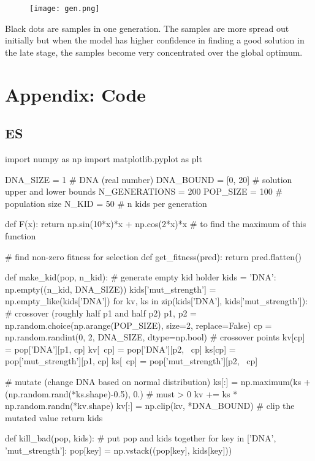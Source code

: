 \documentclass[12pt]{article}
\begin{document}
\begin{figure}[htbp]
	\centering
	\texttt{[image: gen.png]}
\end{figure}
Black dots are samples in one generation. The samples are more spread out initially but when the model has higher confidence in finding a good solution in the late stage, the samples become very concentrated over the global optimum. 

\newpage
\section{Appendix: Code}
\subsection{ES}
\begin{python}
import numpy as np
import matplotlib.pyplot as plt

DNA_SIZE = 1             # DNA (real number)
DNA_BOUND = [0, 20]       # solution upper and lower bounds
N_GENERATIONS = 200
POP_SIZE = 100           # population size
N_KID = 50               # n kids per generation


def F(x): return np.sin(10*x)*x + np.cos(2*x)*x     # to find the maximum of this function


# find non-zero fitness for selection
def get_fitness(pred): return pred.flatten()


def make_kid(pop, n_kid):
    # generate empty kid holder
    kids = {'DNA': np.empty((n_kid, DNA_SIZE))}
    kids['mut_strength'] = np.empty_like(kids['DNA'])
    for kv, ks in zip(kids['DNA'], kids['mut_strength']):
        # crossover (roughly half p1 and half p2)
        p1, p2 = np.random.choice(np.arange(POP_SIZE), size=2, replace=False)
        cp = np.random.randint(0, 2, DNA_SIZE, dtype=np.bool)  # crossover points
        kv[cp] = pop['DNA'][p1, cp]
        kv[~cp] = pop['DNA'][p2, ~cp]
        ks[cp] = pop['mut_strength'][p1, cp]
        ks[~cp] = pop['mut_strength'][p2, ~cp]

        # mutate (change DNA based on normal distribution)
        ks[:] = np.maximum(ks + (np.random.rand(*ks.shape)-0.5), 0.)    # must > 0
        kv += ks * np.random.randn(*kv.shape)
        kv[:] = np.clip(kv, *DNA_BOUND)    # clip the mutated value
    return kids


def kill_bad(pop, kids):
    # put pop and kids together
    for key in ['DNA', 'mut_strength']:
        pop[key] = np.vstack((pop[key], kids[key]))


\end{python}
\end{document}
